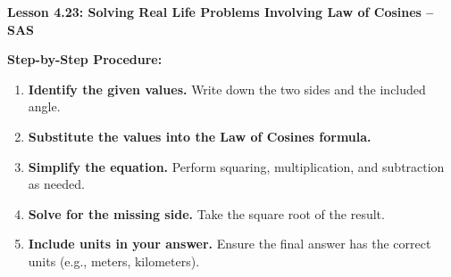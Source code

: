 \begin{center}
\textbf{Lesson 4.23: Solving Real Life Problems Involving Law of Cosines -- SAS}
\end{center}

\vspace*{-1.5ex}

\noindent\textbf{Step-by-Step Procedure:}
\begin{enumerate}
    \item \textbf{Identify the given values.} Write down the two sides and the included angle.
    \item \textbf{Substitute the values into the Law of Cosines formula.}
    \item \textbf{Simplify the equation.} Perform squaring, multiplication, and subtraction as needed.
    \item \textbf{Solve for the missing side.} Take the square root of the result.
    \item \textbf{Include units in your answer.} Ensure the final answer has the correct units (e.g., meters, kilometers).
\end{enumerate}
